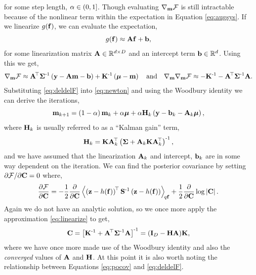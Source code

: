 \documentclass{article} %
\begin{document}
for some step length, $\step \in (0, 1]$. Though evaluating
$\nabla_\pomean\Fengy$ is still intractable because of the nonlinear term
within the expectation in Equation \eqref{eq:augsys}. If we linearize
$\nonlin{\lstate}$, we can evaluate the expectation,
\begin{equation}
    \nonlin{\lstate} \approx \Linmat\lstate + \intcpt,
    \label{eq:linearize}
\end{equation}
for some linearization matrix $\Linmat \in \real{d \times D}$ and an intercept
term $\intcpt \in \real{d}$. Using this we get,
\begin{equation}
    \nabla_\pomean \Fengy
        \approx \Linmat\transpose\lcov\inv\brac{\obs - \Linmat\pomean 
            - \intcpt} + \prcov\inv\brac{\prmean - \pomean}
    \quad \text{and} \quad
    \nabla_\pomean \nabla_\pomean \Fengy
        \approx - \prcov\inv - \Linmat\transpose\lcov\inv\Linmat.
        \label{eq:deldelF}
\end{equation}
Substituting \eqref{eq:deldelF} into \eqref{eq:newton} and using the Woodbury
identity we can derive the iterations,
\begin{equation}
    \pomean_{k+1} = \brac{1-\step}\pomean_k + \step\prmean 
        + \step\Kgain_k\brac{\obs - \intcpt_k - \Linmat_k\prmean},
    \label{eq:pomean}
\end{equation}
where $\Kgain_k$ is usually referred to as  a ``Kalman gain'' term,
\begin{equation}
    \Kgain_k = \prcov\Linmat_k\transpose\brac{\lcov +
        \Linmat_k\prcov\Linmat_k\transpose}\inv,
    \label{eq:kgain}
\end{equation}
and we have assumed that the linearization $\Linmat_k$ and intercept,
$\intcpt_k$ are in some way dependent on the iteration. We can find the 
posterior covariance by setting $\partial\Fengy/\partial\pocov = 0$ where,
\begin{equation}
    \frac{\partial\Fengy}{\partial\pocov} = -\frac{1}{2} 
        \frac{\partial}{\partial\pocov}
        \expec{q\lstate}{
            \brac{\augobs - \augnonlin{\lstate}}\transpose\augcov\inv
            \brac{\augobs - \augnonlin{\lstate}}
    } 
    + \frac{1}{2} \frac{\partial}{\partial\pocov} \log \deter{\pocov}.
\end{equation}
Again we do not have an analytic solution, so we once more apply the
approximation \eqref{eq:linearize} to get,
\begin{equation}
    \pocov = \sbrac{\prcov\inv + \Linmat\transpose\lcov\inv\Linmat}\inv
    = \brac{\ident{D} - \Kgain\Linmat}\!\prcov,
    \label{eq:pocov}
\end{equation}
where we have once more made use of the Woodbury identity and also the
\emph{converged} values of $\Linmat$ and $\Kgain$. At this point it is also
worth noting the relationship between Equations \eqref{eq:pocov} and
\eqref{eq:deldelF}.
\end{document}
